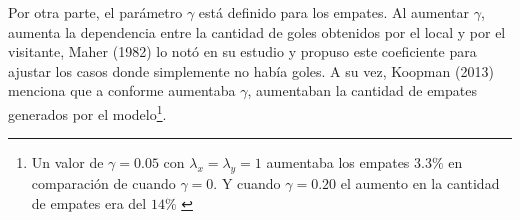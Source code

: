  Por otra parte, el parámetro $\gamma$ está definido para los empates. Al aumentar $\gamma$, aumenta la dependencia entre la cantidad de goles obtenidos por el local y por el visitante, Maher (1982) lo notó en su estudio \cite{maher1982modelling} y propuso este coeficiente para ajustar los casos donde simplemente no había goles. A su vez, Koopman (2013) \cite{koopman2013dynamic} menciona que a conforme aumentaba $\gamma$, aumentaban la cantidad de empates generados por el modelo\footnote{Un valor de $\gamma = 0.05$ con $\lambda_x =\lambda_y = 1$  aumentaba los empates $3.3\%$ en comparación de cuando $\gamma = 0$. Y cuando $\gamma = 0.20$ el aumento en la cantidad de empates era del $14\%$ \cite{koopman2013dynamic}}.  
 
 


 
